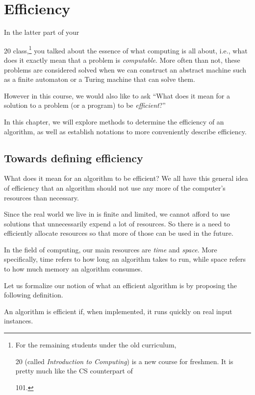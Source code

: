 \chapter{Efficiency}
\label{chap:efficiency}

In the latter part of your \subject{CSci}{20} class,\footnote{For the remaining students under the old curriculum, \subject{CSci}{20} (called \textit{Introduction to Computing}) is a new course for freshmen. It is pretty much like the CS counterpart of \subject{MIS}{101}.} you talked about the essence of what computing is all about, i.e., what does it exactly mean that a problem is \textit{computable}. More often than not, these problems are considered solved when we can construct an abstract machine such as a finite automaton or a Turing machine that can solve them.

However in this course, we would also like to ask ``What does it mean for a solution to a problem (or a program) to be \textit{efficient}?'' 

In this chapter, we will explore methods to determine the efficiency of an algorithm, as well as establish notations to more conveniently describe efficiency.

\section{Towards defining efficiency}
What does it mean for an algorithm to be efficient? We all have this general idea of efficiency that an algorithm should not use any more of the computer's resources than necessary. 

Since the real world we live in is finite and limited, we cannot afford to use solutions that unnecessarily expend a lot of resources. So there is a need to efficiently allocate resources so that more of those can be used in the future. 

In the field of computing, our main resources are \textit{time} and \textit{space}. More specifically, time refers to how long an algorithm takes to run, while space refers to how much memory an algorithm consumes.

Let us formalize our notion of what an efficient algorithm is by proposing the following definition.
\begin{claim}
An algorithm is efficient if, when implemented, it runs quickly on real input instances.
\end{claim}

